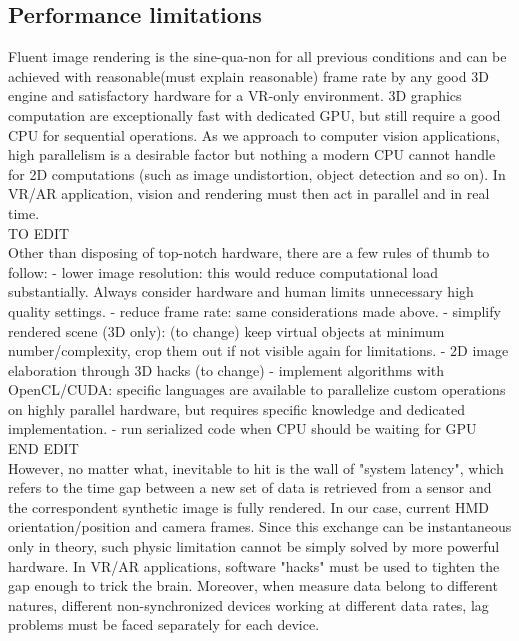 \subsection{Performance limitations}
Fluent image rendering is the sine-qua-non for all previous conditions and can be achieved with reasonable(must explain reasonable) frame rate by any good 3D engine and satisfactory hardware for a VR-only environment. 3D graphics computation are exceptionally fast with dedicated GPU, but still require a good CPU for sequential operations. As we approach to computer vision applications, high parallelism is a desirable factor but nothing a modern CPU cannot handle for 2D computations (such as image undistortion, object detection and so on). In VR/AR application, vision and rendering must then act in parallel and in real time.\\
TO EDIT\\
Other than disposing of top-notch hardware, there are a few rules of thumb to follow:
- lower image resolution: this would reduce computational load substantially. Always consider hardware and human limits unnecessary high quality settings.
- reduce frame rate: same considerations made above.
- simplify rendered scene (3D only): (to change) keep virtual objects at minimum number/complexity, crop them out if not visible again for limitations.
- 2D image elaboration through 3D hacks (to change)
- implement algorithms with OpenCL/CUDA: specific languages are available to parallelize custom operations on highly parallel hardware, but requires specific knowledge and dedicated implementation.
- run serialized code when CPU should be waiting for GPU\\
END EDIT\\
However, no matter what, inevitable to hit is the wall of "system latency", which refers to the time gap between a new set of data is retrieved from a sensor and the correspondent synthetic image is fully rendered. In our case, current HMD orientation/position and camera frames. Since this exchange can be instantaneous only in theory, such physic limitation cannot be simply solved by more powerful hardware. In VR/AR applications, software "hacks" must be used to tighten the gap enough to trick the brain. Moreover, when measure data belong to different natures, different non-synchronized devices working at different data rates, lag problems must be faced separately for each device. 
